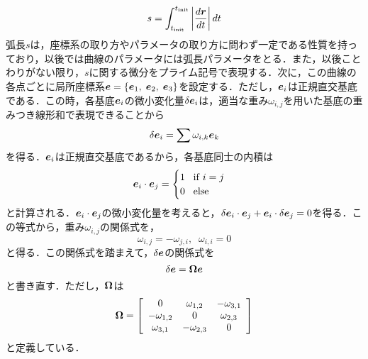  	\begin{equation}\label{eq:def_arclength}
 		s = \int_{t_{\mathrm{init}}}^{t_{\mathrm{init}}} \left| \frac{d \boldsymbol{r}}{dt} \right| dt
 	\end{equation}
	弧長$ s $は，座標系の取り方やパラメータの取り方に問わず一定である性質を持っており，以後では曲線のパラメータには弧長パラメータをとる．また，以後ことわりがない限り，$ s $に関する微分をプライム記号で表現する．次に，この曲線の各点ごとに局所座標系$\boldsymbol{e} =  \{ \boldsymbol{e}_1,\; \boldsymbol{e}_2,\; \boldsymbol{e}_3\} $を設定する．ただし，$ \boldsymbol{e}_i $は正規直交基底である．この時，各基底$ \boldsymbol{e}_i $の微小変化量$ \delta \boldsymbol{e}_i  $は，適当な重み$ \omega_{i,j} $を用いた基底の重みつき線形和で表現できることから
	\begin{equation}\label{eq:delta_e_i_eq}
		\delta \boldsymbol{e}_i = \sum \omega_{i,k} \boldsymbol{e}_k
	\end{equation}
	を得る．$ \boldsymbol{e}_i $は正規直交基底であるから，各基底同士の内積は
	\begin{equation}\label{eq:e_i_dot_e_j}
		\boldsymbol{e}_i \cdot \boldsymbol{e}_j = \begin{cases}
			1\;\;\; \mathrm{if}\; i=j \\
			0 \;\;\; \mathrm{else}	
	\end{cases}
 	\end{equation}
 	と計算される．$ \boldsymbol{e}_i \cdot \boldsymbol{e}_j $の微小変化量を考えると，$ \delta \boldsymbol{e}_i \cdot \boldsymbol{e}_j + \boldsymbol{e}_i \cdot \delta \boldsymbol{e}_j = 0 $を得る．この等式から，重み$ \omega_{i,j}  $の関係式を，
 	\begin{equation}\label{eq:omega_relationship}
 		\omega_{i,j} = -\omega_{j,i},\;\; \omega_{i,i} = 0
 	\end{equation}
 	と得る．この関係式を踏まえて，$ \delta \boldsymbol{e} $の関係式を
 	\begin{equation}\label{eq:omega_diff_eq}
 		\delta \boldsymbol{e} =   \boldsymbol{\Omega} \boldsymbol{e}
 	\end{equation}
 	と書き直す．ただし，$ \boldsymbol{\Omega} $は
 	\begin{equation}\label{eq:Omega_eq}
 		 \boldsymbol{\Omega} = \left[\begin{array}{ccc}
 		 	0&\omega_{1,2}&-\omega_{3,1} \\
 		 	-\omega_{1,2}&0&\omega_{2,3} \\
 		 	\omega_{3,1}&-\omega_{2,3}&0
 		 \end{array} \right]
 	\end{equation}
 	と定義している．
 	
